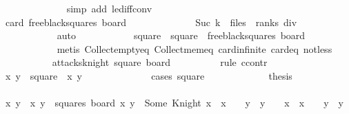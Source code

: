 \begin{isabellebody}
\ \ \ \ \ \ \ \ \ \ \ \ \isamarkupfalse%
\ {\isacharparenleft}simp\ add{\isacharcolon}\ le{\isacharunderscore}diff{\isacharunderscore}conv{\isacharparenright}\isanewline
\ \ \ \ \ \ \ \ \isamarkupfalse%
\isanewline
\ \ \ \ \ \ \ \ \isamarkupfalse%
\ {\isachardoublequoteopen}card\ {\isacharparenleft}free{\isacharunderscore}black{\isacharunderscore}squares\ board{\isacharparenright}\ {\isachargreater}\ {}{\isachardoublequoteclose}\isanewline
\ \ \ \ \ \ \ \ \ \ \isamarkupfalse%
\ {\isacharbackquoteopen}Suc\ k\ {\isasymle}\ {\isacharparenleft}files\ {\isacharasterisk}\ ranks{\isacharparenright}\ div\ {}{\isacharbackquoteclose}\isanewline
\ \ \ \ \ \ \ \ \ \ \isamarkupfalse%
\ auto\isanewline
\ \ \ \ \ \ \ \ \isamarkupfalse%
\ \isamarkupfalse%
\ square\ \ {\isachardoublequoteopen}square\ {\isasymin}\ free{\isacharunderscore}black{\isacharunderscore}squares\ board{\isachardoublequoteclose}\isanewline
\ \ \ \ \ \ \ \ \ \ \isamarkupfalse%
\ {\isacharparenleft}metis\ Collect{\isacharunderscore}empty{\isacharunderscore}eq\ Collect{\isacharunderscore}mem{\isacharunderscore}eq\ card{\isachardot}infinite\ card{\isacharunderscore}{}{\isacharunderscore}eq\ not{\isacharunderscore}less{}{\isacharparenright}\isanewline
\isanewline
\ \ \ \ \ \ \ \ \isamarkupfalse%
\ {\isachardoublequoteopen}{\isasymnot}\ attacks{\isacharunderscore}knight\ square\ board{\isachardoublequoteclose}\isanewline
\ \ \ \ \ \ \ \ \isamarkupfalse%
\ {\isacharparenleft}rule\ ccontr{\isacharparenright}\isanewline
\ \ \ \ \ \ \ \ \ \ \isamarkupfalse%
\ x\ y\ \ {\isachardoublequoteopen}square\ {\isacharequal}\ {\isacharparenleft}x{\isacharcomma}\ y{\isacharparenright}{\isachardoublequoteclose}\isanewline
\ \ \ \ \ \ \ \ \ \ \ \ \isamarkupfalse%
\ {\isacharparenleft}cases\ square{\isacharparenright}\isanewline
\ \ \ \ \ \ \ \ \ \ \isamarkupfalse%
\ {\isachardoublequoteopen}{\isasymnot}\ {\isacharquery}thesis{\isachardoublequoteclose}\isanewline
\ \ \ \ \ \ \ \ \ \ \isamarkupfalse%
\ \isamarkupfalse%
\ x{\isacharprime}\ y{\isacharprime}\ \ {\isachardoublequoteopen}{\isacharparenleft}x{\isacharprime}{\isacharcomma}\ y{\isacharprime}{\isacharparenright}\ {\isasymin}\ squares{\isachardoublequoteclose}\ {\isachardoublequoteopen}board\ {\isacharparenleft}x{\isacharprime}{\isacharcomma}\ y{\isacharprime}{\isacharparenright}\ {\isacharequal}\ Some\ Knight{\isachardoublequoteclose}\ {\isachardoublequoteopen}{\isasymbar}x\ {\isacharminus}\ x{\isacharprime}{\isasymbar}\ {\isacharequal}\ {}\ {\isasymand}\ {\isasymbar}y\ {\isacharminus}\ y{\isacharprime}{\isasymbar}\ {\isacharequal}\ {}\ {\isasymor}\ {\isasymbar}x\ {\isacharminus}\ x{\isacharprime}{\isasymbar}\ {\isacharequal}\ {}\ {\isasymand}\ {\isasymbar}y\ {\isacharminus}\ y{\isacharprime}{\isasymbar}\ {\isacharequal}\ {}{\isachardoublequoteclose}\isanewline

\end{isabellebody}
